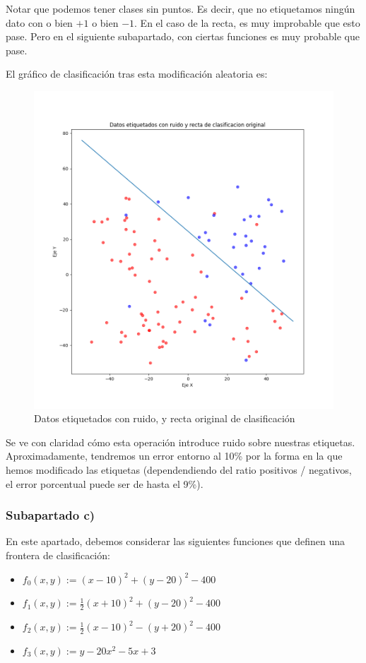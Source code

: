 \documentclass[11pt]{article}
\begin{document}
Notar que podemos tener clases sin puntos. Es decir, que no etiquetamos ningún dato con o bien $+1$ o bien $-1$. En el caso de la recta, es muy improbable que esto pase. Pero en el siguiente subapartado, con ciertas funciones es muy probable que pase.

El gráfico de clasificación tras esta modificación aleatoria es:

\begin{figure}[H]
    \includegraphics[width = 0.8 \textwidth]{puntos_clasificados_recta_aleatorizados01}
    \caption{Datos etiquetados con ruido, y recta original de clasificación}
\end{figure}

Se ve con claridad cómo esta operación introduce ruido sobre nuestras etiquetas. Aproximadamente, tendremos un error entorno al 10\% por la forma en la que hemos modificado las etiquetas (dependendiendo del ratio positivos / negativos, el error porcentual puede ser de hasta el 9\%).

\subsubsection{Subapartado c)} \label{section:apartado_obligatorio}

En este apartado, debemos considerar las siguientes funciones que definen una frontera de clasificación:

\begin{itemize}
    \item $f_0(x, y):= (x - 10)^2 + (y - 20)^2 - 400$
    \item $f_1(x, y):= \frac{1}{2} (x + 10)^2 + (y - 20)^2 - 400$
    \item $f_2(x, y):= \frac{1}{2} (x - 10)^2 - (y + 20)^2 - 400$
    \item $f_3(x, y):= y - 20x^2 -5x +3$
\end{itemize}
\end{document}
